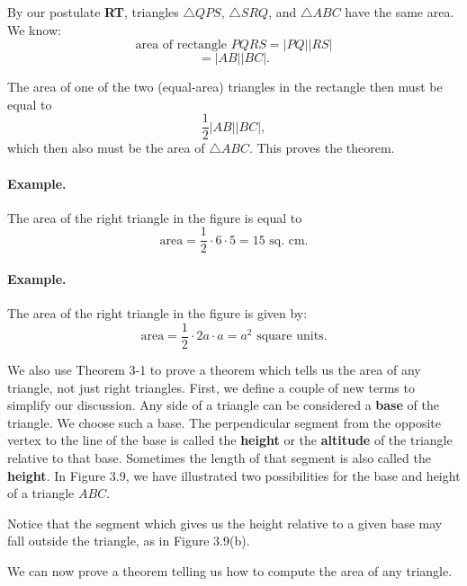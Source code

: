 \documentclass[12pt]{book} %
\begin{document}

By our postulate \textbf{RT}, triangles $\triangle QPS$, $\triangle SRQ$, and $\triangle ABC$ have the same area. We know:
\[
\text{area of rectangle }PQRS = |PQ||RS|
\]
\[
= |AB||BC|.
\]

The area of one of the two (equal-area) triangles in the rectangle then must be equal to
\[
\frac12|AB||BC|,
\]
which then also must be the area of $\triangle ABC$. This proves the theorem.

\paragraph{Example.}
The area of the right triangle in the figure is equal to
\[
\text{area}=\frac12\cdot 6\cdot 5=15 \text{ sq. cm.}
\]


\paragraph{Example.}
The area of the right triangle in the figure is given by:
\[
\text{area}=\frac12\cdot 2a\cdot a = a^2 \text{ square units.}
\]


We also use Theorem 3-1 to prove a theorem which tells us the area of any triangle, not just right triangles. First, we define a couple of new terms to simplify our discussion. Any side of a triangle can be considered a \textbf{base} of the triangle. We choose such a base. The perpendicular segment from the opposite vertex to the line of the base is called the \textbf{height} or the \textbf{altitude} of the triangle relative to that base. Sometimes the length of that segment is also called the \textbf{height}. In Figure 3.9, we have illustrated two possibilities for the base and height of a triangle $ABC$.


Notice that the segment which gives us the height relative to a given base may fall outside the triangle, as in Figure 3.9(b).

We can now prove a theorem telling us how to compute the area of any triangle.

\end{document}
